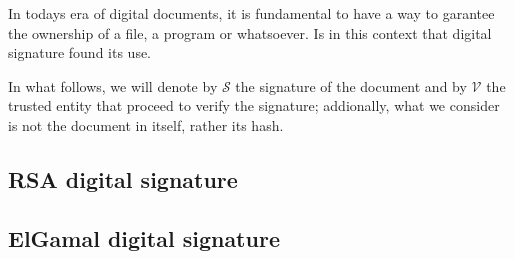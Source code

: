 \documentclass{subfiles}
\begin{document}
    In todays era of digital documents, it is fundamental to have a way 
        to garantee the ownership of a file, a program or whatsoever.
        Is in this context that digital signature found its use.
        
    In what follows, we will denote by \(\mathcal{S}\) the signature of the document and 
        by \(\mathcal{V}\) the trusted entity that proceed to verify the signature;
        addionally, what we consider is not the document in itself, rather its hash.

    \subsection{RSA digital signature}
    

    \subsection{ElGamal digital signature}
    
    \clearpage
\end{document}
